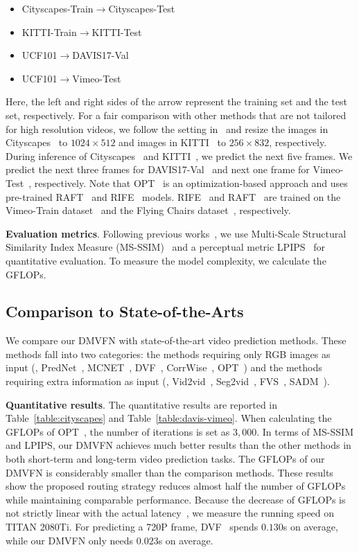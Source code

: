 \documentclass[10pt,twocolumn,letterpaper]{article}
\begin{document}
\begin{itemize}
\itemsep-0.03in
\item Cityscapes-Train$\rightarrow$Cityscapes-Test
\item KITTI-Train$\rightarrow$KITTI-Test
\item UCF101$\rightarrow$DAVIS17-Val
\item UCF101$\rightarrow$Vimeo-Test
\end{itemize}
Here, the left and right sides of the arrow represent the training set and the test set, respectively. For a fair comparison with other methods that are not tailored for high resolution videos, we follow the setting in~\cite{fvs} and resize the images in Cityscapes~\cite{cityscapes} to $1024\times 512$ and images in KITTI~\cite{kitti} to $256\times 832$, respectively. During inference of Cityscapes~\cite{cityscapes} and KITTI~\cite{kitti}, we predict the next five frames. We predict the next three frames for DAVIS17-Val~\cite{davis} and next one frame for Vimeo-Test~\cite{vimeo}, respectively. Note that OPT~\cite{wu2022optimizing} is an optimization-based approach and uses pre-trained RAFT~\cite{raft} and RIFE~\cite{rife} models. RIFE~\cite{rife} and RAFT~\cite{raft} are trained on the Vimeo-Train dataset~\cite{vimeo} and the Flying Chairs dataset~\cite{flownet}, respectively.

\noindent
\textbf{Evaluation metrics}. Following previous works~\cite{wu2022optimizing}, we use Multi-Scale Structural Similarity Index Measure (MS-SSIM)~\cite{msssim} and a perceptual metric LPIPS~\cite{lpips} for quantitative evaluation. To measure the model complexity, we calculate the GFLOPs.

\subsection{Comparison to State-of-the-Arts}
\label{sec:comparison}
We compare our DMVFN with state-of-the-art video prediction methods. These methods fall into two categories: the methods requiring only RGB images as input (\eg, PredNet~\cite{prednet}, MCNET~\cite{mcnet}, DVF~\cite{dvf}, CorrWise~\cite{corrwise}, OPT~\cite{wu2022optimizing}) and the methods requiring extra information as input (\eg, Vid2vid~\cite{vid2vid}, Seg2vid~\cite{seg2vid}, FVS~\cite{fvs}, SADM~\cite{sadm}). 


\noindent
\textbf{Quantitative results}. The quantitative results are reported in Table~\ref{table:cityscapes} and Table~\ref{table:davis-vimeo}. When calculating the GFLOPs of OPT~\cite{wu2022optimizing}, the number of iterations is set as $3,000$. In terms of MS-SSIM and LPIPS, our DMVFN achieves much better results than the other methods in both short-term and long-term video prediction tasks. The GFLOPs of our DMVFN is considerably smaller than the comparison methods. These results show the proposed routing strategy reduces almost half the number of GFLOPs while maintaining comparable performance. Because the decrease of GFLOPs is not strictly linear with the actual latency~\cite{regnet}, we measure the running speed on TITAN 2080Ti. For predicting a 720P frame, DVF~\cite{dvf} spends $0.130$s on average, while our DMVFN only needs $0.023$s on average.
\end{document}
